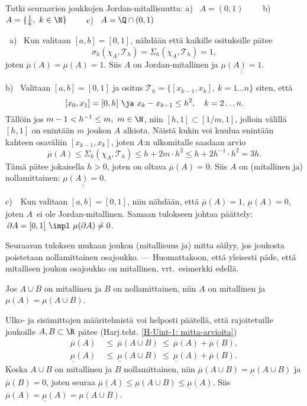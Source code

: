 \begin{Exa} \label{mitallisuusesim-R}
Tutki seuraavien joukkojen Jordan-mitallisuutta: \vspace{1mm}\newline
a) \ $A=(0,1)\qquad$  b) \ $A=\{\frac{1}{k}, \ k\in\N\} \qquad$ c) \ $A=\Q\cap (0,1)$
\end{Exa}
\ratk \ a) \ Kun valitaan $[a,b]=[0,1]$, nähdään että kaikille osituksille pätee
\[
\sigma_h(\chi_A,\mathcal{T}_h)=\Sigma_h(\chi_A,\mathcal{T}_h)=1,
\]
joten $\overline{\mu}(A)=\underline{\mu}(A)=1$. Siis $A$ on Jordan-mitallinen ja 
$\underline{\underline{\mu(A)=1}}$.

b) \ Valitaan $[a,b]=[0,1]$ ja ositus $\mathcal{T}_h=\{[x_{k-1},x_k],\ k=1\ldots n\}$
siten, että
\[
[x_0,x_1]=[0,h]\ \ja\ x_k-x_{k-1} \le h^2,\quad k=2\ldots n.
\]
Tällöin jos $m-1 < h^{-1} \le m,\ m \in \N$, niin $[h,1] \subset [1/m,1]$, jolloin välillä 
$[h,1]$ on enintään $m$ joukon $A$ alkiota. Näistä kukin voi kuulua enintään kahteen osaväliin
$[x_{k-1},x_k]$, joten $A$:n ulkomitalle saadaan arvio
\[
\overline{\mu}(A) \le \Sigma_h(\chi_A,\mathcal{T}_h) 
                  \le h + 2m \cdot h^2 \le h + 2h^{-1} \cdot h^2 = 3h.
\]
Tämä pätee jokaisella $h>0$, joten on oltava $\overline{\mu}(A)=0$. Siis $A$ on (mitallinen ja)
nollamittainen: $\underline{\underline{\mu(A)=0}}$.

c)\ \, Kun valitaan $[a,b]=[0,1]$, niin nähdään, että $\overline{\mu}(A)=1$, 
$\underline{\mu}(A)=0$, joten $A$ ei ole Jordan-mitallinen. Samaan tulokseen johtaa päättely:
$\,\partial A = [0,1]\ \impl\ \mu(\partial A) \neq 0$. \loppu

Seuraavan tuloksen mukaan joukon (mitallisuus ja) mitta säilyy, jos joukosta poistetaan 
nollamittainen osajoukko. --- Huomattakoon, että yleisesti  päde, että mitallisen 
joukon osajoukko on mitallinen, vrt.\ esimerkki edellä.
\begin{Prop} \label{nollamittaisen osajoukon poisto} Jos $A \cup B$ on mitallinen ja $B$ on
nollamittainen, niin $A$ on mitallinen ja $\mu(A)=\mu(A \cup B)$.
\end{Prop}
\tod Ulko- ja sisämittojen määritelmistä voi helposti päätellä, että rajoitetuille joukoille 
$A,B \subset \R$ pätee (Harj.teht. \ref{H-Uint-1: mitta-arvioita})
\begin{align*}
\overline{\mu}(A)\  &\le\ \overline{\mu}(A \cup B)\ \le\ \overline{\mu}(A)+\overline{\mu}(B), \\
\underline{\mu}(A)\ &\le\ \underline{\mu}(A \cup B)\ \le\ \underline{\mu}(A)+\overline{\mu}(B).
\end{align*}
Koska $A \cup B$ on mitallinen ja $B$ nollamittainen, niin 
$\overline{\mu}(A \cup B) = \underline{\mu}(A \cup B)$ ja $\overline{\mu}(B)=0$, joten seuraa
$\overline{\mu}(A)\le\mu(A \cup B)\le\underline{\mu}(A)$. Siis
$\overline{\mu}(A)=\underline{\mu}(A)=\mu(A \cup B)$. \loppu

